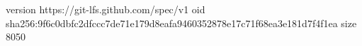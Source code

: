 version https://git-lfs.github.com/spec/v1
oid sha256:9f6c0dbfc2dfccc7de71e179d8eafa9460352878e17c71f68ea3e181d7f4f1ea
size 8050

